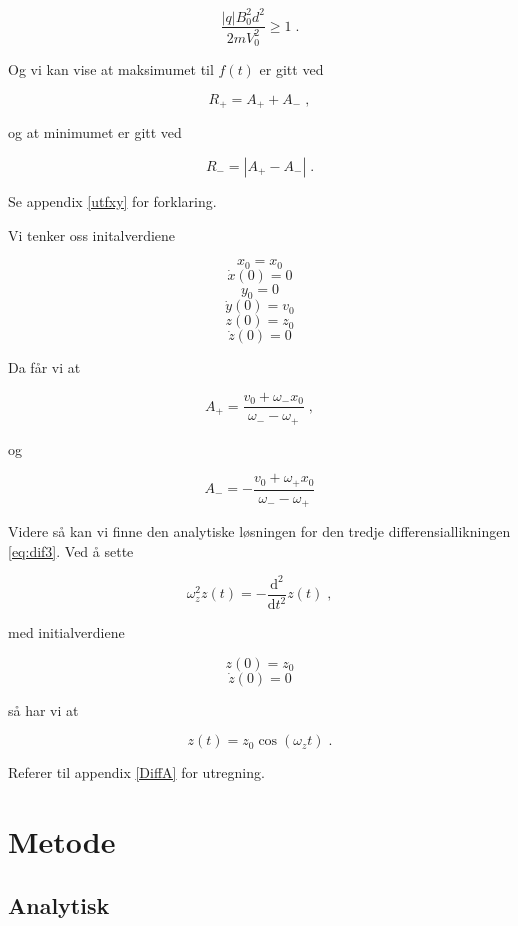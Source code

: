 \documentclass[reprint,english,notitlepage, nofootinbib]{revtex4-1}  %
\begin{document}
\begin{equation}
\frac{|q|B_0^2d^2}{2mV_0^2} \geq 1 \; .
\end{equation}

Og vi kan vise at maksimumet til $f(t)$ er gitt ved

\begin{equation}\label{fmaks}
R_+ = A_+ + A_- \; ,
\end{equation}

og at minimumet er gitt ved

\begin{equation}\label{fmin}
R_- = \left | A_+ - A_- \right | \; .
\end{equation}

Se appendix \ref{utfxy} for forklaring. 

Vi tenker oss initalverdiene

$$x_0 = x_0$$
$$\dot{x}(0) = 0$$
$$y_0 = 0$$
$$\dot{y}(0) = v_0$$
$$z(0) = z_0$$
$$\dot{z}(0) = 0$$

Da får vi at

\begin{equation}
\label{Aplus}
A_+ = \frac{v_0+\omega_-x_0}{\omega_--\omega_+} \; ,
\end{equation}

og

\begin{equation}
\label{Amin}
A_- = -\frac{v_0+\omega_+x_0}{\omega_--\omega_+}
\end{equation}

Videre så kan vi finne den analytiske løsningen for den tredje differensiallikningen \eqref{eq:dif3}. Ved å sette

$$\omega_z^2z(t) = - \frac{\mathrm{d}^2}{\mathrm{d}t^2}z(t) \; ,$$

med initialverdiene 

$$z(0) = z_0$$
$$\dot{z}(0) = 0$$

så har vi at

$$z(t) = z_0 \cos{(\omega_zt)} \; .$$

Referer til appendix \ref{DiffA} for utregning.

\section{Metode}

\subsection*{Analytisk}
\end{document}
